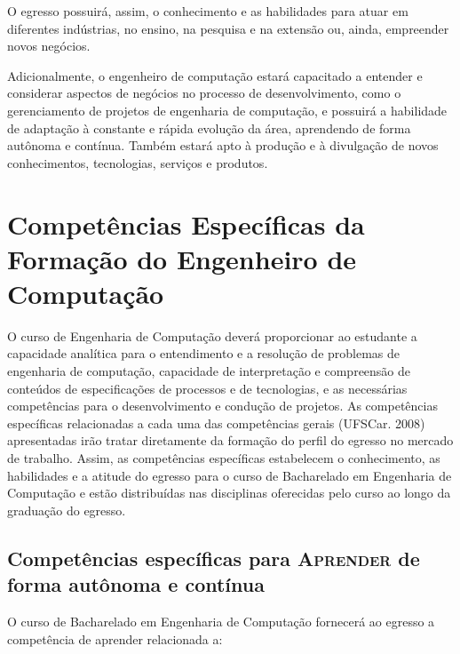 O egresso possuirá, assim, o conhecimento e as habilidades para atuar em diferentes indústrias, no ensino, na pesquisa e na extensão ou, ainda, empreender novos negócios.

Adicionalmente, o engenheiro de computação estará capacitado a entender e considerar aspectos de negócios no processo de desenvolvimento, como o gerenciamento de projetos de engenharia de computação, e possuirá a habilidade de adaptação à constante e rápida evolução da área, aprendendo de forma autônoma e contínua. Também estará apto à produção e à divulgação de novos conhecimentos, tecnologias, serviços e produtos.


\section{Competências Específicas da Formação do Engenheiro de Computação}\label{sec:competencias-especificas-da-formacao-do-engenheiro-de-computacao}

O curso de Engenharia de Computação deverá proporcionar ao estudante a capacidade analítica para o entendimento e a resolução de problemas de engenharia de computação, capacidade de interpretação e compreensão de conteúdos de especificações de processos e de tecnologias, e as necessárias competências para o desenvolvimento e condução de projetos. As competências específicas relacionadas a cada uma das competências gerais (UFSCar. 2008) apresentadas irão tratar diretamente da formação do perfil do egresso no mercado de trabalho. Assim, as competências específicas estabelecem o conhecimento, as habilidades e a atitude do egresso para o curso de Bacharelado em Engenharia de Computação e estão distribuídas nas disciplinas oferecidas pelo curso ao longo da graduação do egresso.

\subsection*{Competências específicas para \textsc{Aprender} de forma autônoma e contínua}\label{sec:competencias-especificas-para-aprender-de-forma-autonoma-e-continua}

O curso de Bacharelado em Engenharia de Computação fornecerá ao egresso a competência de aprender relacionada a:

